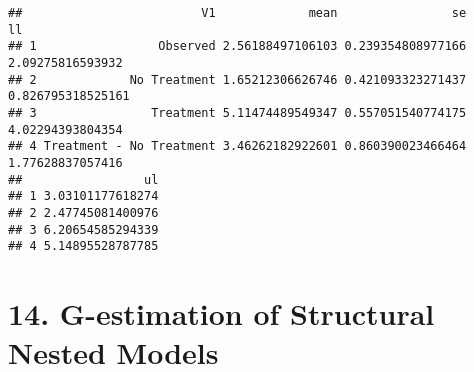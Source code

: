 \documentclass[
  10pt,
]{book}
\newenvironment{Shaded}{\begin{snugshade}}{\end{snugshade}}
\newcommand{\CommentTok}[1]{\textcolor[rgb]{0.56,0.35,0.01}{\textit{#1}}}
\newcommand{\DataTypeTok}[1]{\textcolor[rgb]{0.13,0.29,0.53}{#1}}
\newcommand{\DecValTok}[1]{\textcolor[rgb]{0.00,0.00,0.81}{#1}}
\newcommand{\FloatTok}[1]{\textcolor[rgb]{0.00,0.00,0.81}{#1}}
\newcommand{\KeywordTok}[1]{\textcolor[rgb]{0.13,0.29,0.53}{\textbf{#1}}}
\newcommand{\NormalTok}[1]{#1}
\newcommand{\OperatorTok}[1]{\textcolor[rgb]{0.81,0.36,0.00}{\textbf{#1}}}
\newcommand{\StringTok}[1]{\textcolor[rgb]{0.31,0.60,0.02}{#1}}
\begin{document}
\begin{Shaded}
\end{Shaded}

\begin{verbatim}
##                         V1             mean                se                ll
## 1                 Observed 2.56188497106103 0.239354808977166  2.09275816593932
## 2             No Treatment 1.65212306626746 0.421093323271437 0.826795318525161
## 3                Treatment 5.11474489549347 0.557051540774175  4.02294393804354
## 4 Treatment - No Treatment 3.46262182922601 0.860390023466464  1.77628837057416
##                 ul
## 1 3.03101177618274
## 2 2.47745081400976
## 3 6.20654585294339
## 4 5.14895528787785
\end{verbatim}

\hypertarget{g-estimation-of-structural-nested-models}{%
\chapter*{14. G-estimation of Structural Nested Models}\label{g-estimation-of-structural-nested-models}}
\end{document}
